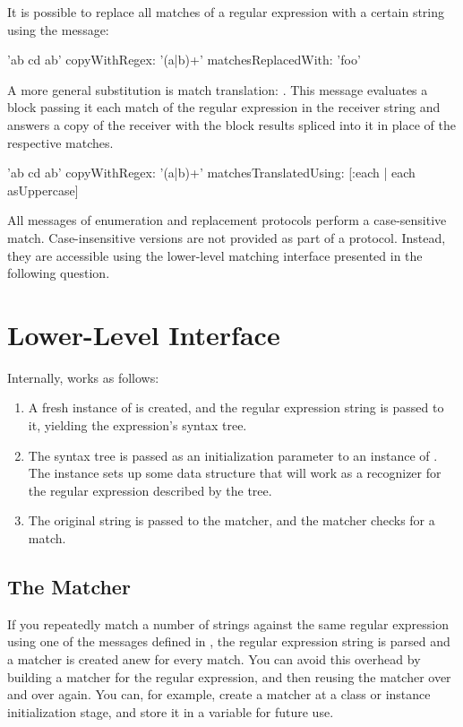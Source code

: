 \documentclass[a4paper,10pt,twoside]{book}
\begin{document}
{It is possible to replace all matches of a regular expression with a certain string using the message: 	

\begin{code}{}
'ab cd ab' copyWithRegex: '(a|b)+' matchesReplacedWith: 'foo' 
\end{code}


A more general substitution is match translation: . This message evaluates a block passing it each match of the regular expression in the receiver string and answers a copy of the receiver with the block results spliced into it in place of the respective matches.  

\begin{code}{}
'ab cd ab' copyWithRegex: '(a|b)+' matchesTranslatedUsing: [:each | each asUppercase] 
\end{code}



All messages of enumeration and replacement protocols perform a case-sensitive match.  Case-insensitive versions are not provided as part of a  protocol.  Instead, they are accessible using the lower-level matching interface presented in the following question. 	

\section{Lower-Level Interface}

Internally,   works as follows: 

\begin{enumerate}
\item A fresh instance of  is created, and the regular expression string is passed to it, yielding the expression's syntax tree. 
\item  The syntax tree is passed as an initialization parameter to an instance of . The instance sets up some data structure that will work as a recognizer for the regular expression described by the tree. 
\item The original string is passed to the matcher, and the matcher checks for a match. 
\end{enumerate}	




\subsection{The Matcher}
If you repeatedly match a number of strings against the same regular expression using one of the messages defined in , the regular expression string is parsed and a matcher is created anew for every match.  You can avoid this overhead by building a matcher for the regular expression, and then reusing the matcher over and over again. You can, for example, create a matcher at a class or instance initialization stage, and store it in a variable for future use. 

}
\end{document}
